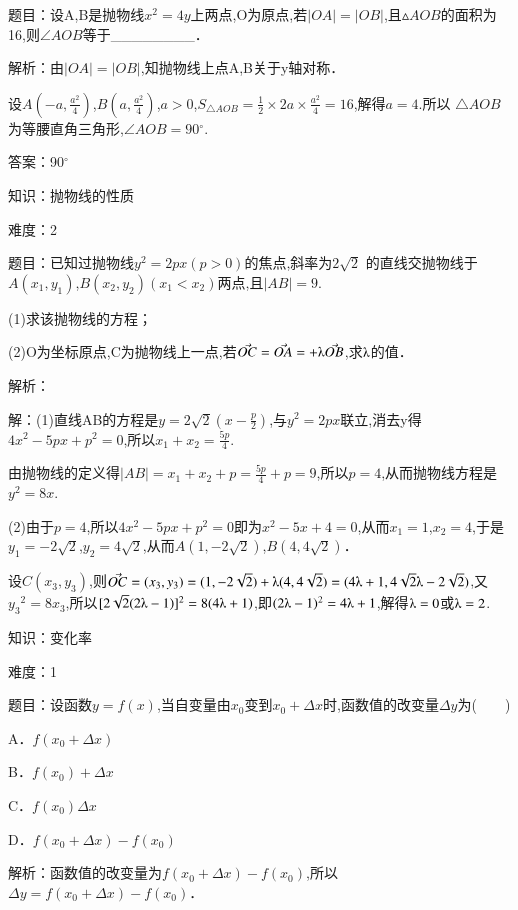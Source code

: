 \documentclass{article} %
\begin{document}
题目：设A,B是抛物线$x^{2}=4y$上两点,O为原点,若$|OA|=|OB|$,且${\vartriangle}AOB$的面积为16,则${\angle}AOB$等于\_\_\_\_\_\_\_\_．

解析：由$|OA|=|OB|$,知抛物线上点A,B关于y轴对称．

设$A(-a,\frac{a^2}{4})$,$B(a,\frac{a^2}{4})$,$a>0$,$S_{\triangle AOB}=\frac{1}{2}{\times}2a{\times}\frac{a^2}{4}=16$,解得$a=4$.所以 $\triangle AOB$为等腰直角三角形,$\angle AOB=90{{}^\circ}$.

答案：90${{}^\circ}$



\noindent 知识：抛物线的性质

难度：2

题目：已知过抛物线$y^{2}=2px(p{>}0)$的焦点,斜率为$2\sqrt{2}$ 的直线交抛物线于$A(x_{1},y_{1})$,$B(x_{2},y_{2})(x_{1}{<}x_{2})$两点,且$|AB|=9$.

(1)求该抛物线的方程；

(2)O为坐标原点,C为抛物线上一点,若$\vec{OC}=\vec{OA}=+\lambdaup\vec{OB}$,求$\lambdaup$的值．

解析：

解：(1)直线AB的方程是$y=2\sqrt{2}(x-\frac{p}{2})$,与$y^{2}=2px$联立,消去y得$4x^{2}-5px+p^{2}=0$,所以$x_{1}+x_{2}=\frac{5p}{4}$.

由抛物线的定义得$|AB|=x_{1}+x_{2}+p=\frac{5p}{4}+p=9$,所以$p=4$,从而抛物线方程是$y^{2}=8x$.

(2)由于$p=4$,所以$4x^{2}-5px+p^{2}=0$即为$x^{2}-5x+4=0$,从而$x_{1}=1$,$x_{2}=4$,于是$y_{1}=-2\sqrt{2}$,$y_{2}=4\sqrt{2}$,从而$A(1,-2\sqrt{2})$,$B(4,4\sqrt{2})$．

设$C(x_{3},y_{3})$,则$\vec{OC}=(x_{3},y_{3})=(1,-2\sqrt{2})+\lambdaup(4,4\sqrt{2})=(4\lambdaup+1,4\sqrt{2}\lambdaup-2\sqrt{2})$,又${y_3}^2=8x_{3}$,所以$[2\sqrt{2}(2\lambdaup-1)]^{2}=8(4\lambdaup+1)$,即$(2\lambdaup-1)^{2}=4\lambdaup+1$,解得$\lambdaup=0$或$\lambdaup=2$.

\noindent 

知识：变化率

难度：1

题目：设函数$y=f(x)$,当自变量由$x_{0}$变到$x_{0}+\Delta x$时,函数值的改变量$\Delta y$为(　　)

A．$f(x_{0}+\Delta x)$　　 

B．$f(x_{0})+\Delta x$

C．$f(x_{0})\Delta x$   

D．$f(x_{0}+\Delta x)-f(x_{0})$

解析：函数值的改变量为$f(x_{0}+\Delta x)-f(x_{0})$,所以$\Delta y=f(x_{0}+\Delta x)-f(x_{0})$．
\end{document}
